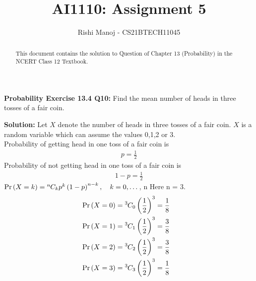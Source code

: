 \documentclass[journal,12pt,twocolumn]{IEEEtran}
\begin{document}
	
	
	\providecommand{\mbf}{\mathbf}
	\providecommand{\pr}[1]{\ensuremath{\Pr\left(#1\right)}}
	\providecommand{\qfunc}[1]{\ensuremath{Q\left(#1\right)}}
	\providecommand{\sbrak}[1]{\ensuremath{{}\left[#1\right]}}
	\providecommand{\lsbrak}[1]{\ensuremath{{}\left[#1\right.}}
	\providecommand{\rsbrak}[1]{\ensuremath{{}\left.#1\right]}}
	\providecommand{\brak}[1]{\ensuremath{\left(#1\right)}}
	\providecommand{\lbrak}[1]{\ensuremath{\left(#1\right.}}
	\providecommand{\rbrak}[1]{\ensuremath{\left.#1\right)}}
	\providecommand{\cbrak}[1]{\ensuremath{\left\{#1\right\}}}
	\providecommand{\lcbrak}[1]{\ensuremath{\left\{#1\right.}}
	\providecommand{\rcbrak}[1]{\ensuremath{\left.#1\right\}}}
	\providecommand{\dec}[2]{\ensuremath{\overset{#1}{\underset{#2}{\gtrless}}}}
	\newcommand{\myvec}[1]{\ensuremath{\begin{pmatrix}#1\end{pmatrix}}}
	\newcommand{\mydet}[1]{\ensuremath{\begin{vmatrix}#1\end{vmatrix}}}
	\newcommand*{\permcomb}[4][0mu]{{{}^{#3}\mkern#1#2_{#4}}}
	\newcommand*{\perm}[1][-3mu]{\permcomb[#1]{P}}
	\newcommand*{\comb}[1][-1mu]{\permcomb[#1]{C}}
		\title{
				AI1110: Assignment 5
		}
		\author{
			Rishi Manoj - CS21BTECH11045
		}
			
	\maketitle
	\begin{abstract}
		This document contains the solution to Question of Chapter 13 (Probability) in the NCERT Class 12 Textbook.
	\end{abstract}
	
	\textbf{Probability Exercise 13.4 Q10:}
	Find the mean number of heads in three tosses of a fair coin.
	
	\textbf{Solution:}
	Let $X$ denote the number of heads in three tosses of a fair coin. $X$ is a random variable which can assume the values 0,1,2 or 3.\\
	Probability of getting head in one toss of a fair coin is
	\begin{align}
	& p = \frac{1}{2} &
	\end{align}
	Probability of not getting head in one toss of a fair coin is
	\begin{align}
    & 1-p = \frac{1}{2} &
    \end{align}	
$\pr{X = k} = \comb{n}{k}p^k\brak{1-p}^{n-k}, \quad k = 0,\dots$, n 
	Here n = 3.
	\begin{align}
	&\pr{X = 0} = \comb{3}{0}\brak{\frac{1}{2}}^3 = \frac{1}{8} &\\
	&\pr{X =1} = \comb{3}{1}\brak{\frac{1}{2}}^3 = \frac{3}{8} &\\
	&\pr{X =2} = \comb{3}{2}\brak{\frac{1}{2}}^3  = \frac{3}{8}&\\
	&\pr{X =3} = \comb{3}{3}\brak{\frac{1}{2}}^3 = \frac{1}{8} & 
	\end{align}
\end{document}
